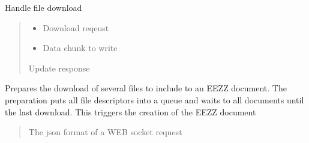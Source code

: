\documentclass[letterpaper,10pt,english]{sphinxmanual}
\begin{document}
\begin{savenotes}
\begin{fulllineitems}
\begin{savenotes}\begin{fulllineitems}
\label{\detokenize{eezz:eezz.document.TDocuments.handle_download}}
\pysigstartsignatures
{}
\pysigstopsignatures
\sphinxAtStartPar
Handle file download
\begin{quote}\begin{description}
\begin{itemize}
\item {} 
\sphinxAtStartPar
{} \textendash{} Download reqeust

\item {} 
\sphinxAtStartPar
{} \textendash{} Data chunk to write

\end{itemize}

\sphinxAtStartPar
Update response

\end{description}\end{quote}

\end{fulllineitems}\end{savenotes}


\begin{savenotes}\begin{fulllineitems}
\label{\detokenize{eezz:eezz.document.TDocuments.prepare_download}}
\pysigstartsignatures
{}
\pysigstopsignatures
\sphinxAtStartPar
Prepares the download of several files to include to an EEZZ document.
The preparation puts all file descriptors into a queue and waits to all documents until the last download.
This triggers the creation of the EEZZ document
\begin{quote}\begin{description}
\sphinxAtStartPar
{} \textendash{} The json format of a WEB socket request


\end{description}
\end{quote}
\end{fulllineitems}
\end{savenotes}
\end{fulllineitems}
\end{savenotes}
\end{document}

